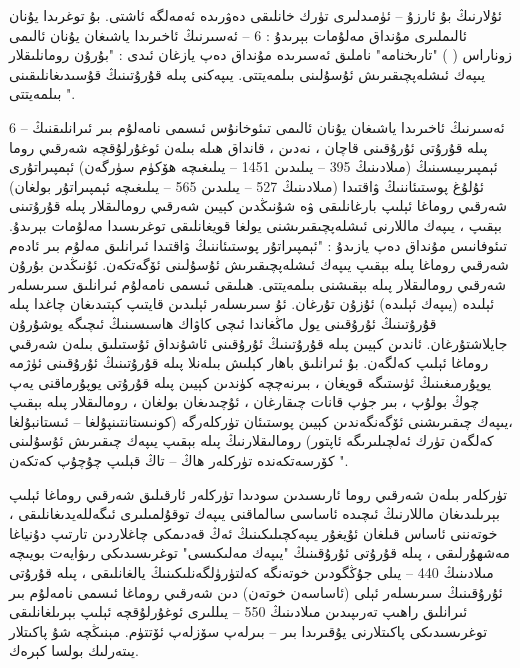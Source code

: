 \documentclass[a4paper]{article}
\begin{document}
\begin{flushright}
ئۇلارنىڭ بۇ ئارزۇ – ئۈمىدلىرى تۈرك خانلىقى دەۋرىدە ئەمەلگە ئاشتى. بۇ توغرىدا يۇنان ئالىملىرى مۇنداق مەلۇمات بېرىدۇ : 6 – ئەسىرنىڭ ئاخىرىدا ياشىغان يۇنان ئالىمى زوناراس ( ) "تارىخنامە" ناملىق ئەسىرىدە مۇنداق دەپ يازغان ئىدى : "بۇرۇن رومانلىقلار يىپەك ئىشلەپچىقىرىش ئۇسۇلىنى بىلمەيتتى. يىپەكنى پىلە قۇرۇتىنىڭ قۇسىدىغانلىقىنى بىلمەيتتى ".



6 – ئەسىرنىڭ ئاخىرىدا ياشىغان يۇنان ئالىمى تىئوخانۇس ئىسمى نامەلۇم بىر ئىرانلىقنىڭ پىلە قۇرۇتى ئۇرۇقىنى قاچان ، نەدىن ، قانداق ھىلە بىلەن ئوغۇرلۇقچە شەرقىي روما ئېمپىرىيىسىنىڭ (مىلادىنىڭ 395 – يىلىدىن 1451 – يىلىغىچە ھۆكۈم سۈرگەن) ئېمپىراتۇرى ئۇلۇغ پوستىئاننىڭ ۋاقتىدا (مىلادىنىڭ 527 – يىلىدىن 565 – يىلىغىچە ئېمپىراتۇر بولغان) شەرقىي روماغا ئېلىپ بارغانلىقى ۋە شۇنىڭدىن كېيىن شەرقىي رومالىقلار پىلە قۇرۇتىنى بېقىپ ، يىپەك ماللارنى ئىشلەپچىقىرىشنى يولغا قويغانلىقى توغرىسىدا مەلۇمات بېرىدۇ. تىئوفانىس مۇنداق دەپ يازىدۇ : "ئېمپىراتۇر پوستىئاننىڭ ۋاقتىدا ئىرانلىق مەلۇم بىر ئادەم شەرقىي روماغا پىلە بېقىپ يىپەك ئىشلەپچىقىرىش ئۇسۇلىنى ئۆگەتكەن. ئۇنىڭدىن بۇرۇن شەرقىي رومالىقلار پىلە بېقىشنى بىلمەيتتى. ھىلىقى ئىسمى نامەلۇم ئىرانلىق سىرىسلەر ئېلىدە (يىپەك ئېلىدە) ئۇزۇن تۇرغان. ئۇ سىرىسلەر ئېلىدىن قايتىپ كېتىدىغان چاغدا پىلە قۇرۇتىنىڭ ئۇرۇقىنى يول ماڭغاندا ئىچى كاۋاك ھاسىسىنىڭ ئىچىگە يوشۇرۇن جايلاشتۇرغان. ئاندىن كېيىن پىلە قۇرۇتىنىڭ ئۇرۇقىنى ئاشۇنداق ئۇستىلىق بىلەن شەرقىي روماغا ئېلىپ كەلگەن. بۇ ئىرانلىق باھار كېلىش بىلەنلا پىلە قۇرۇتىنىڭ ئۇرۇقىنى ئۈژمە يوپۇرمىغىنىڭ ئۈستىگە قويغان ، بىرنەچچە كۈندىن كېيىن پىلە قۇرۇتى يوپۇرماقنى يەپ چوڭ بولۇپ ، بىر جۈپ قانات چىقارغان ، ئۇچىدىغان بولغان ، رومالىقلار پىلە بېقىپ ،يىپەك چىقىرىشنى ئۆگەنگەندىن كېيىن پوستىئان تۈركلەرگە (كونىستانتىنپۇلغا – ئىستانبۇلغا كەلگەن تۈرك ئەلچىلىرىگە ئاپتور) رومالىقلارنىڭ پىلە بېقىپ يىپەك چىقىرىش ئۇسۇلىنى كۆرسەتكەندە تۈركلەر ھاڭ – تاڭ قېلىپ چۇچۇپ كەتكەن ".



تۈركلەر بىلەن شەرقىي روما ئارىسىدىن سودىدا تۈركلەر ئارقىلىق شەرقىي روماغا ئېلىپ بېرىلىدىغان ماللارنىڭ ئىچىدە ئاساسى سالماقنى يىپەك توقۇلمىلىرى ئىگەللەيدىغانلىقى ، خوتەننى ئاساس قىلغان ئۇيغۇر يىپەكچىلىكىنىڭ ئەڭ قەدىمكى چاغلاردىن تارتىپ دۇنياغا مەشھۇرلىقى ، پىلە قۇرۇتى ئۇرۇقىنىڭ "يىپەك مەلىكىسى" توغرىسىدىكى رىۋايەت بويىچە مىلادىنىڭ 440 – يىلى جۇڭگودىن خوتەنگە كەلتۈرۈلگەنلىكىنىڭ يالغانلىقى ، پىلە قۇرۇتى ئۇرۇقىنىڭ سىرىسلەر ئېلى (ئاساسەن خوتەن) دىن شەرقىي روماغا ئىسمى نامەلۇم بىر ئىرانلىق راھىپ تەرىپىدىن مىلادىنىڭ 550 – يىللىرى ئوغۇرلۇقچە ئېلىپ بېرىلغانلىقى توغرىسىدىكى پاكىتلارنى يۇقىرىدا بىر – بىرلەپ سۆزلەپ ئۆتتۈم. مېنىڭچە شۇ پاكىتلار يىتەرلىك بولسا كېرەك.




\end{flushright}
\end{document}
